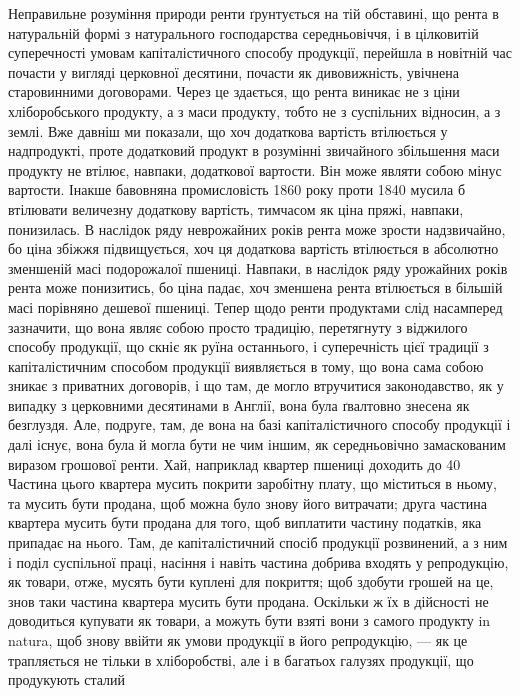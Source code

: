 Неправильне розуміння природи ренти ґрунтується на тій обставині, що
рента в натуральній формі з натурального господарства середньовіччя, і в цілковитій
суперечності умовам капіталістичного способу продукції, перейшла в новітній
час почасти у вигляді церковної десятини, почасти як дивовижність, увічнена
старовинними договорами. Через це здається, що рента виникає не з ціни
хліборобського продукту, а з маси продукту, тобто не з суспільних відносин,
а з землі. Вже давніш ми показали, що хоч додаткова вартість втілюється у
надпродукті, проте додатковий продукт в розумінні звичайного збільшення маси
продукту не втілює, навпаки, додаткової вартости. Він може являти собою мінус
вартости. Інакше бавовняна промисловість 1860 року проти 1840 мусила б
втілювати величезну додаткову вартість, тимчасом як ціна пряжі, навпаки, понизилась. В наслідок ряду
неврожайних років рента може зрости надзвичайно,
бо ціна збіжжя підвищується, хоч ця додаткова вартість втілюється в абсолютно
зменшеній масі подорожалої пшениці. Навпаки, в наслідок ряду урожайних
років рента може понизитись, бо ціна падає, хоч зменшена рента втілюється в
більшій масі порівняно дешевої пшениці. Тепер щодо ренти продуктами слід
насамперед зазначити, що вона являє собою просто традицію, перетягнуту з віджилого
способу продукції, що скніє як руїна останнього, і суперечність цієї
традиції з капіталістичним способом продукції виявляється в тому, що вона
сама собою зникає з приватних договорів, і що там, де могло втручитися законодавство,
як у випадку з церковними десятинами в Англії, вона була ґвалтовно
знесена як безглуздя. Але, подруге, там, де вона на базі капіталістичного
способу продукції і далі існує, вона була й могла бути не чим іншим, як
середньовічно замаскованим виразом грошової ренти. Хай, наприклад квартер
пшениці доходить до 40 Частина цього квартера мусить покрити заробітну
плату, що міститься в ньому, та мусить бути продана, щоб можна було знову
його витрачати; друга частина квартера мусить бути продана для того, щоб виплатити
частину податків, яка припадає на нього. Там, де капіталістичний
спосіб продукції розвинений, а з ним і поділ суспільної праці, насіння і навіть
частина добрива входять у репродукцію, як товари, отже, мусять бути куплені
для покриття; щоб здобути грошей на це, знов таки частина квартера мусить
бути продана. Оскільки ж їх в дійсності не доводиться купувати як товари,
а можуть бути взяті вони з самого продукту in natura, щоб знову
ввійти як умови продукції в його репродукцію, — як це трапляється не тільки
в хліборобстві, але і в багатьох галузях продукції, що продукують сталий
\parbreak{}  %
